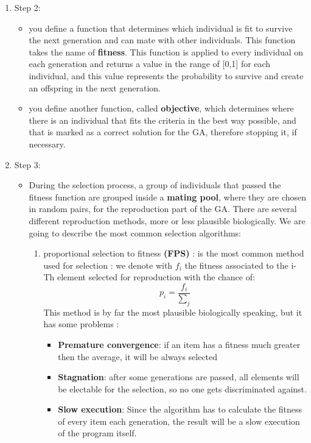 \documentclass{article}
\begin{document}
\begin{enumerate}
		\item Step 2: \newline
		\begin{itemize}
			\item you define a function that determines which individual is fit to survive the next generation and can mate with other individuals. This function takes the name of \textbf{fitness}. This function is applied to every individual on each generation and returns a value in the range of [0,1] for each individual, and this value represents the probability to survive and create an offspring in the next generation.
			\item you define another function, called \textbf{objective}, which determines where there is an individual that fits the criteria in the best way possible, and that is marked as a correct solution for the GA, therefore stopping it, if necessary.
		\end{itemize}
		\item Step 3:
		\begin{itemize}
			\item During the selection process, a group of individuals that passed the fitness function are grouped inside a \textbf{mating pool}, where they are chosen in random pairs, for the reproduction part of the GA. There are several different reproduction methods, more or less plausible biologically. We are going to describe the most common selection algorithms:
			\begin{enumerate}
				\item  proportional selection to fitness \textbf{(FPS)} : is the most common method used for selection : we denote with $f_i$ the fitness associated to the i-Th element
				selected for reproduction with the chance of:
				\[p_i= \frac{f_i}{\sum_{j}^{} } \]
				This method is by far the most plausible biologically speaking,  but it has some problems :
				\begin{itemize}
					\item \textbf{Premature convergence}: if an item has a fitness much greater then the average, it will be always selected
					\item \textbf{Stagnation}: after some generations are passed, all elements will be electable for the selection, so no one gets discriminated against.
					\item \textbf{Slow execution}: Since the algorithm has to calculate the fitness of every item each generation, the result will be a slow execution of the program itself.
				\end{itemize}

\end{enumerate}
\end{itemize}
\end{enumerate}
\end{document}

